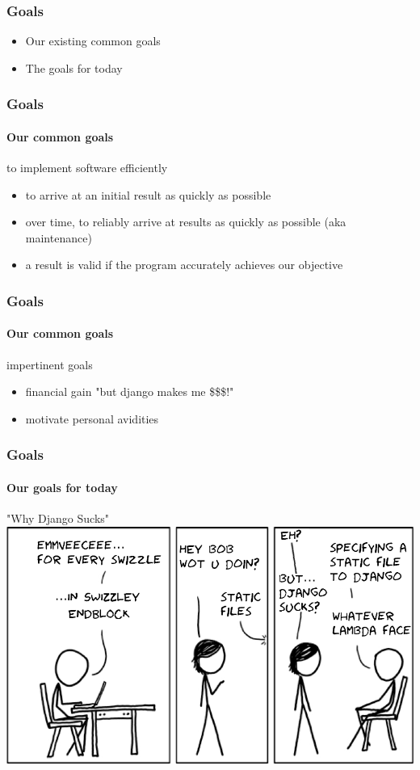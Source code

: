\begin{frame}
\frametitle{Goals}
\begin{itemize}
\item Our existing common goals
\item The goals for today
\end{itemize}
\end{frame}


\begin{frame}
\frametitle{Goals}
\framesubtitle{Our common goals}
\begin{block}{to implement software efficiently}
\begin{itemize}
\item to arrive at an initial result as quickly as possible
\item over time, to reliably arrive at results as quickly as possible (aka maintenance)
\item a result is valid if the program accurately achieves our objective
\end{itemize}
\end{block}
\end{frame}


\begin{frame}
\frametitle{Goals}
\framesubtitle{Our common goals}
\begin{block}{impertinent goals}
\begin{itemize}
\item financial gain "but django makes me \$\$\$!"
\item motivate personal avidities
\end{itemize}
\end{block}
\end{frame}


\begin{frame}
\frametitle{Goals}
\framesubtitle{Our goals for today}
\begin{block}{"Why Django Sucks"}
\includegraphics[width=0.7\paperwidth]{image/why-django-sucks.png}
\end{block}
\end{frame}


